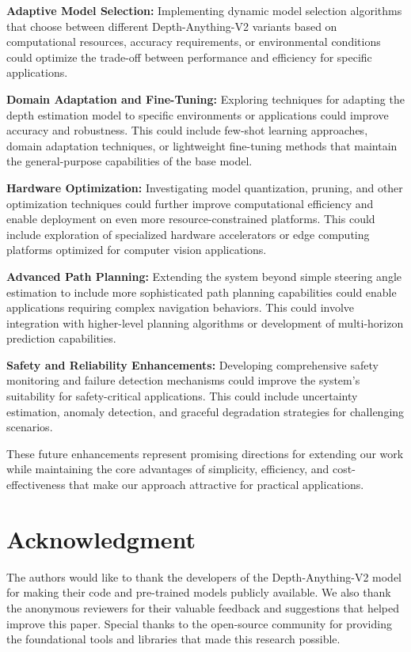\documentclass[conference]{IEEEtran}
\begin{document}
\textbf{Adaptive Model Selection:} Implementing dynamic model selection algorithms that choose between different Depth-Anything-V2 variants based on computational resources, accuracy requirements, or environmental conditions could optimize the trade-off between performance and efficiency for specific applications.

\textbf{Domain Adaptation and Fine-Tuning:} Exploring techniques for adapting the depth estimation model to specific environments or applications could improve accuracy and robustness. This could include few-shot learning approaches, domain adaptation techniques, or lightweight fine-tuning methods that maintain the general-purpose capabilities of the base model.

\textbf{Hardware Optimization:} Investigating model quantization, pruning, and other optimization techniques could further improve computational efficiency and enable deployment on even more resource-constrained platforms. This could include exploration of specialized hardware accelerators or edge computing platforms optimized for computer vision applications.

\textbf{Advanced Path Planning:} Extending the system beyond simple steering angle estimation to include more sophisticated path planning capabilities could enable applications requiring complex navigation behaviors. This could involve integration with higher-level planning algorithms or development of multi-horizon prediction capabilities.

\textbf{Safety and Reliability Enhancements:} Developing comprehensive safety monitoring and failure detection mechanisms could improve the system's suitability for safety-critical applications. This could include uncertainty estimation, anomaly detection, and graceful degradation strategies for challenging scenarios.

These future enhancements represent promising directions for extending our work while maintaining the core advantages of simplicity, efficiency, and cost-effectiveness that make our approach attractive for practical applications.

\section*{Acknowledgment}
The authors would like to thank the developers of the Depth-Anything-V2 model for making their code and pre-trained models publicly available. We also thank the anonymous reviewers for their valuable feedback and suggestions that helped improve this paper. Special thanks to the open-source community for providing the foundational tools and libraries that made this research possible.
\end{document}
